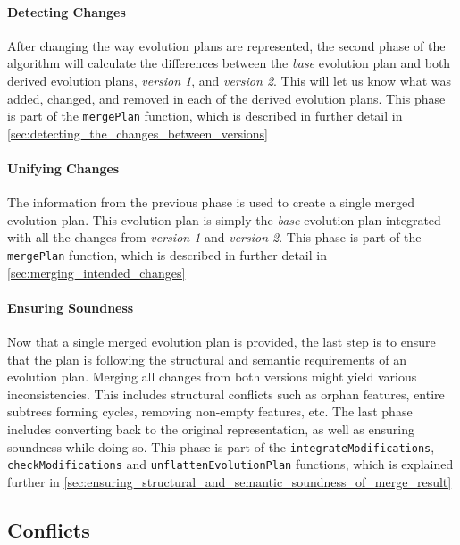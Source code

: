 \documentclass[a4paper,english]{ifimaster}
\begin{document}
\paragraph{Detecting Changes}%
\label{par:detecting_changes}

After changing the way evolution plans are represented, the second phase of the algorithm will calculate the differences between the \textit{base} evolution plan and both derived evolution plans, \textit{version 1}, and \textit{version 2}. This will let us know what was added, changed, and removed in each of the derived evolution plans. This phase is part of the \texttt{mergePlan} function, which is described in further detail in \vref{sec:detecting_the_changes_between_versions}

\paragraph{Unifying Changes}%
\label{par:unifying_changes}

The information from the previous phase is used to create a single merged evolution plan. This evolution plan is simply the \textit{base} evolution plan integrated with all the changes from \textit{version 1} and \textit{version 2}. This phase is part of the \texttt{mergePlan} function, which is described in further detail in \vref{sec:merging_intended_changes}

\paragraph{Ensuring Soundness}%
\label{par:ensuring_soundness}

Now that a single merged evolution plan is provided, the last step is to ensure that the plan is following the structural and semantic requirements of an evolution plan. Merging all changes from both versions might yield various inconsistencies. This includes structural conflicts such as orphan features, entire subtrees forming cycles, removing non-empty features, etc. The last phase includes converting back to the original representation, as well as ensuring soundness while doing so. This phase is part of the \texttt{integrate\-Modifications}, \texttt{check\-Modifications} and \texttt{unflatten\-Evolution\-Plan} functions, which is explained further in \vref{sec:ensuring_structural_and_semantic_soundness_of_merge_result}

\subsection{Conflicts}%
\label{sub:conflicts}
\end{document}
